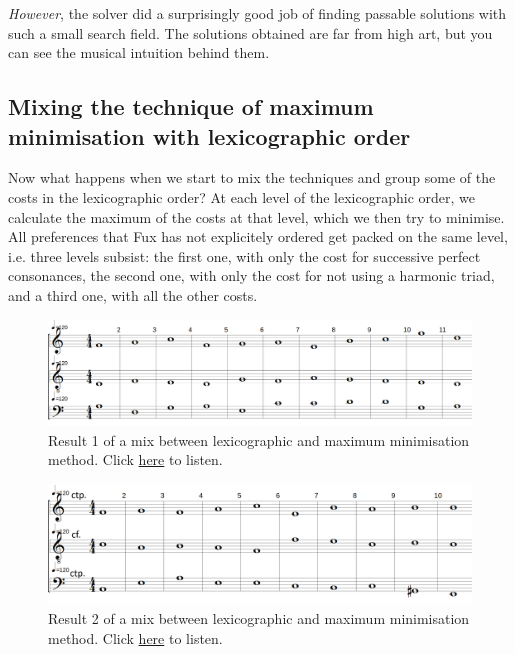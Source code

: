 \textit{However}, the solver did a surprisingly good job of finding passable solutions with such a small search field. The solutions obtained are far from high art, but you can see the musical intuition behind them.

\subsection{Mixing the technique of maximum minimisation with lexicographic order}\label{subsection:mixing-the-techniques}
Now what happens when we start to mix the techniques and group some of the costs in the lexicographic order? At each level of the lexicographic order, we calculate the maximum of the costs at that level, which we then try to minimise. All preferences that Fux has not explicitely ordered get packed on the same level, i.e. three levels subsist: the first one, with only the cost for successive perfect consonances, the second one, with only the cost for not using a harmonic triad, and a third one, with all the other costs.

\begin{figure}[h]
    \centering
    \includegraphics[width=1\textwidth]{Images/Experiments/min-1sp.png}
    \caption{Result 1 of a mix between lexicographic and maximum minimisation method. Click \href{https://youtu.be/qJ_mjtz02R0}{here} to listen.}
    \label{fig:min-sp}
\end{figure} 
\begin{figure}[h]
    \centering
    \includegraphics[width=1\textwidth]{Images/Experiments/min-1sp0.png}
    \caption{Result 2 of a mix between lexicographic and maximum minimisation method. Click \href{https://youtu.be/GRGE7NN3jNE}{here} to listen.}
    \label{fig:min-sp0}
\end{figure}

